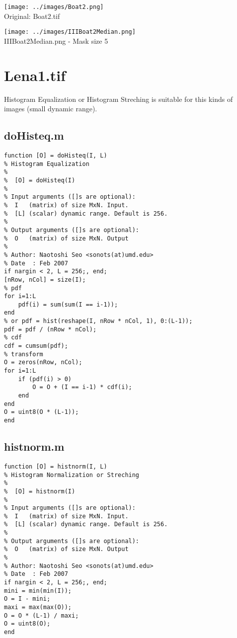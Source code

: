 \documentclass[article,oneside]{memoir}
\begin{document}
\begin{highboostfilter2.m}
\begin{center}
\texttt{[image: ../images/Boat2.png]}\\
Original: Boat2.tif
\end{center}

\begin{center}
\texttt{[image: ../images/IIIBoat2Median.png]}\\
IIIBoat2Median.png - Mask size 5
\end{center}

\section{Lena1.tif}

Histogram Equalization or Histogram Streching is suitable for this kinds of images (small dynamic range). 

\subsection{doHisteq.m}
\begin{verbatim}
function [O] = doHisteq(I, L)
% Histogram Equalization
%
%  [O] = doHisteq(I)
%
% Input arguments ([]s are optional):
%  I   (matrix) of size MxN. Input.
%  [L] (scalar) dynamic range. Default is 256.
%
% Output arguments ([]s are optional):
%  O   (matrix) of size MxN. Output
%
% Author: Naotoshi Seo <sonots(at)umd.edu>
% Date  : Feb 2007
if nargin < 2, L = 256;, end;
[nRow, nCol] = size(I);
% pdf
for i=1:L
    pdf(i) = sum(sum(I == i-1));
end
% or pdf = hist(reshape(I, nRow * nCol, 1), 0:(L-1));
pdf = pdf / (nRow * nCol);
% cdf
cdf = cumsum(pdf);
% transform
O = zeros(nRow, nCol);
for i=1:L
    if (pdf(i) > 0)
        O = O + (I == i-1) * cdf(i);
    end
end
O = uint8(O * (L-1));
end
\end{verbatim}

\subsection{histnorm.m}

\begin{verbatim}
function [O] = histnorm(I, L)
% Histogram Normalization or Streching
%
%  [O] = histnorm(I)
%
% Input arguments ([]s are optional):
%  I   (matrix) of size MxN. Input.
%  [L] (scalar) dynamic range. Default is 256.
%
% Output arguments ([]s are optional):
%  O   (matrix) of size MxN. Output
%
% Author: Naotoshi Seo <sonots(at)umd.edu>
% Date  : Feb 2007
if nargin < 2, L = 256;, end;
mini = min(min(I));
O = I - mini;
maxi = max(max(O));
O = O * (L-1) / maxi;
O = uint8(O);
end
\end{verbatim}



\end{highboostfilter2.m}
\end{document}
